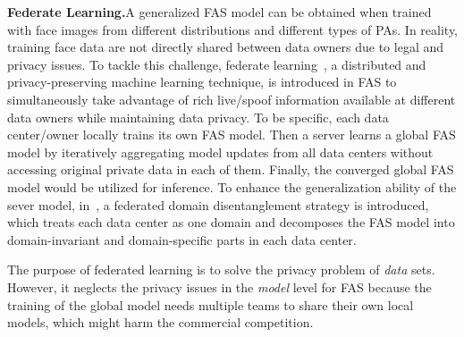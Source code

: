 \documentclass[10pt,journal,compsoc]{IEEEtran}
\begin{document}
\vspace{0.4em}
\noindent\textbf{Federate Learning.}\quad   A generalized FAS model can be obtained when trained with face images from different distributions and different types of PAs. In reality, training face data are not directly shared between data owners due to legal and privacy issues. To tackle this challenge, federate learning~\cite{mcmahan2017communication}, a distributed and privacy-preserving machine learning technique, is introduced in FAS to simultaneously take advantage of rich live/spoof information available at different data owners while maintaining data privacy. To be specific, each data center/owner locally trains its own FAS model. Then a server learns a global FAS model by iteratively aggregating model updates from all data centers without accessing original private data in each of them. Finally, the converged global FAS model would be utilized for inference. To enhance the generalization ability of the sever model, in~\cite{shao2020federated}, a federated domain disentanglement strategy is introduced, which treats each data center as one domain and decomposes the FAS model into domain-invariant and domain-specific parts in each data center.

The purpose of federated learning is to solve the privacy problem of \textit{data} sets. However, it neglects the privacy issues in the \textit{model} level for FAS because the training of the global model needs multiple teams to share their own local models, which might harm the commercial competition. 
\end{document}
